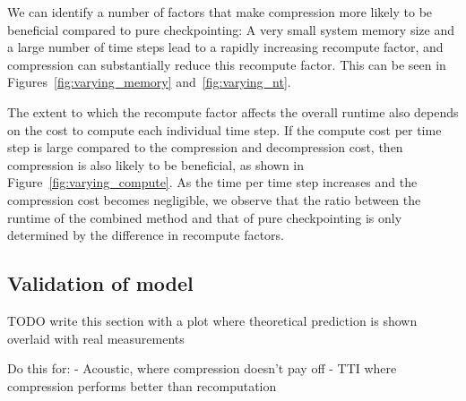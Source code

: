 We can identify a number of factors that make compression more likely to be
beneficial compared to pure checkpointing: A very small system memory size and a
large number of time steps lead to a rapidly increasing recompute factor, and
compression can substantially reduce this recompute factor. This can be seen in
Figures~\ref{fig:varying_memory} and~\ref{fig:varying_nt}.

The extent to which the recompute factor affects the overall runtime also
depends on the cost to compute each individual time step. If the compute cost
per time step is large compared to the compression and decompression cost, then
compression is also likely to be beneficial, as shown in
Figure~\ref{fig:varying_compute}. As the time per time step increases and the
compression cost becomes negligible, we observe that the ratio between the runtime
of the combined method and that of pure checkpointing is only determined by the
difference in recompute factors.

\subsection{Validation of model}
TODO write this section with a plot where theoretical prediction is
shown overlaid with real measurements

Do this for: 
- Acoustic, where compression doesn't pay off
- TTI where compression performs better than recomputation

